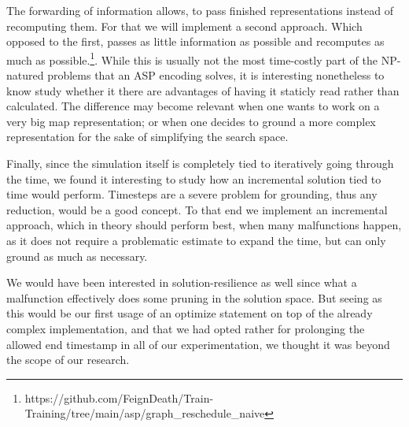 The forwarding of information allows, to pass finished representations instead of recomputing them. For that we will implement a second approach. Which opposed to the first, passes as little information as possible and recomputes as much as possible.\footnote{https://github.com/FeignDeath/Train-Training/tree/main/asp/graph\_reschedule\_naive}. While this is usually not the most time-costly part of the NP-natured problems that an ASP encoding solves, it is interesting nonetheless to know study whether it there are advantages of having it staticly read rather than calculated. The difference may become relevant when one wants to work on a very big map representation; or when one decides to ground a more complex representation for the sake of simplifying the search space.


Finally, since the simulation itself is completely tied to iteratively going through the time, we found it interesting to study how an incremental solution tied to time would perform. Timesteps are a severe problem for grounding, thus any reduction, would be a good concept. To that end we implement an incremental approach, which in theory should perform best, when many malfunctions happen, as it does not require a problematic estimate to expand the time, but can only ground as much as necessary.


We would have been interested in solution-resilience as well since what a malfunction effectively does some pruning in the solution space. But seeing as this would be our first usage of an optimize statement on top of the already complex implementation, and that we had opted rather for prolonging the allowed end timestamp in all of our experimentation, we thought it was beyond the scope of our research.



